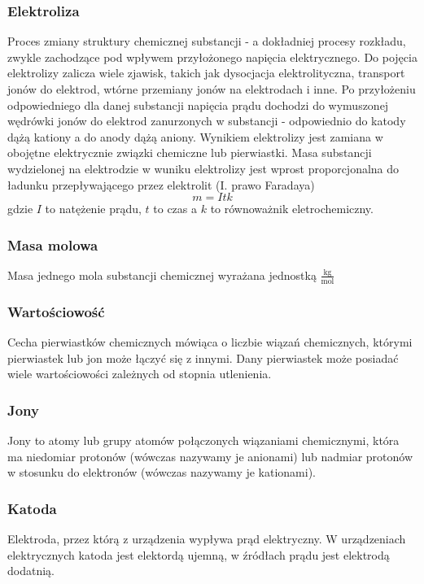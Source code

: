 \documentclass[a4paper,12pts]{article}
\begin{document}
			\subsubsection{Elektroliza}
			Proces zmiany struktury chemicznej substancji - a dokładniej procesy rozkładu, zwykle zachodzące pod wpływem przyłożonego napięcia elektrycznego. Do pojęcia elektrolizy zalicza wiele zjawisk, takich jak dysocjacja elektrolityczna, transport jonów do elektrod, wtórne przemiany jonów na elektrodach i inne. Po przyłożeniu odpowiedniego dla danej substancji napięcia prądu dochodzi do wymuszonej wędrówki jonów do elektrod zanurzonych w  substancji - odpowiednio do katody dążą kationy a do anody dążą aniony. Wynikiem elektrolizy jest zamiana w obojętne elektrycznie związki chemiczne lub pierwiastki. Masa substancji wydzielonej na elektrodzie w wuniku elektrolizy jest wprost proporcjonalna do ładunku przepływającego przez elektrolit (I. prawo Faradaya)
			\begin{equation}
				m = Itk
			\end{equation}
			gdzie $I$ to natężenie prądu, $t$ to czas a $k$ to równoważnik eletrochemiczny.
			
			\subsubsection{Masa molowa}
			Masa jednego mola substancji chemicznej wyrażana jednostką $\frac{\textrm{kg}}{\textrm{mol}}$
			
			\subsubsection{Wartościowość}
			Cecha pierwiastków chemicznych mówiąca o liczbie wiązań chemicznych, którymi pierwiastek lub jon może łączyć się z innymi. Dany pierwiastek może posiadać wiele wartościowości zależnych od stopnia utlenienia.
			
			\subsubsection{Jony}
			Jony to atomy lub grupy atomów połączonych wiązaniami chemicznymi, która ma niedomiar protonów (wówczas nazywamy je anionami) lub nadmiar protonów w stosunku do elektronów (wówczas nazywamy je kationami).
			
			\subsubsection{Katoda}
			Elektroda, przez którą z urządzenia wypływa prąd elektryczny. W urządzeniach elektrycznych katoda jest elektordą ujemną, w źródłach prądu jest elektrodą dodatnią.
			
\end{document}
